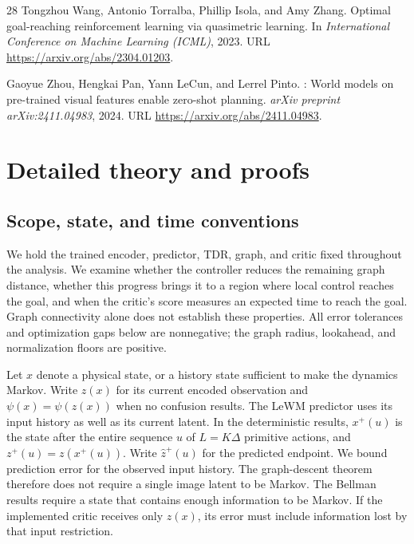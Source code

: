 \documentclass{article}
\theoremstyle{definition}
\theoremstyle{remark}
\begin{document}
\begin{thebibliography}{28}
Tongzhou Wang, Antonio Torralba, Phillip Isola, and Amy Zhang.
\newblock Optimal goal-reaching reinforcement learning via quasimetric
  learning.
\newblock In \emph{International Conference on Machine Learning (ICML)}, 2023.
\newblock URL \url{https://arxiv.org/abs/2304.01203}.

Gaoyue Zhou, Hengkai Pan, Yann LeCun, and Lerrel Pinto.
: World models on pre-trained visual features enable
  zero-shot planning.
\newblock \emph{arXiv preprint arXiv:2411.04983}, 2024.
\newblock URL \url{https://arxiv.org/abs/2411.04983}.

\end{thebibliography}
\clearpage
\appendix
\section{Detailed theory and proofs}
\label{app:theory}

\subsection{Scope, state, and time conventions}
\label{app:theory-setup}
We hold the trained encoder, predictor, TDR, graph, and critic fixed throughout the analysis.
We examine whether the controller reduces the remaining graph distance, whether this
progress brings it to a region where local control reaches the goal, and when the
critic's score measures an expected time to reach the goal.
Graph connectivity alone does not establish these properties.
All error tolerances and optimization gaps below are nonnegative; the graph radius,
lookahead, and normalization floors are positive.

Let $x$ denote a physical state, or a history state sufficient to make the dynamics
Markov. Write $z(x)$ for its current encoded observation and
$\psi(x)=\psi(z(x))$ when no confusion results. The LeWM predictor uses
its input history as well as its current latent. In the deterministic results,
$x^+(u)$ is the state after the entire sequence $u$ of $L=K\Delta$ primitive actions,
and $z^+(u)=z(x^+(u))$. Write $\hat z^+(u)$ for the predicted endpoint.
We bound prediction error for the observed input history.
The graph-descent theorem therefore does not require a single image latent to be Markov.
The Bellman results require a state that contains enough information to be Markov.
If the implemented critic receives only $z(x)$, its error must include information lost
by that input restriction.
\end{document}
